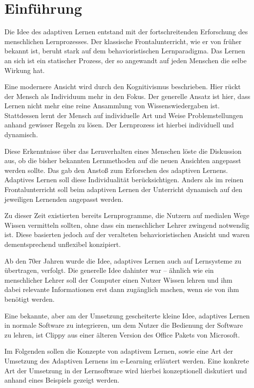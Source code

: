 \chapter{Einführung}

Die Idee des adaptiven Lernen entstand mit der fortschreitenden
Erforschung des menschlichen Lernprozesses.
Der klassische Frontalunterricht, wie er von früher bekannt ist,
beruht stark auf dem behavioristischen Lernparadigma.
Das Lernen an sich ist ein statischer Prozess, der so angewandt
auf jeden Menschen die selbe Wirkung hat.

Eine modernere Ansicht wird durch den Kognitivismus
beschrieben. Hier rückt der Mensch als Individuum mehr in den Fokus.
Der generelle Ansatz ist hier, dass Lernen nicht mehr eine reine
Ansammlung von Wissenswiedergaben ist. Stattdessen lernt der Mensch
auf individuelle Art und Weise Problemstellungen anhand gewisser Regeln zu lösen.
Der Lernprozess ist hierbei individuell und dynamisch.

Diese Erkenntnisse über das Lernverhalten eines Menschen löste die Diskussion aus,
ob die bisher bekannten Lernmethoden auf die neuen Ansichten angepasst werden sollte.
Das gab den Anstoß zum Erforschen des adaptiven Lernens.
Adaptives Lernen soll diese Individualität berücksichtigen.
Anders als im reinen Frontalunterricht soll beim adaptiven Lernen
der Unterricht dynamisch auf den jeweiligen Lernenden angepasst werden.

Zu dieser Zeit existierten bereits Lernprogramme, die Nutzern
auf medialen Wege Wissen vermitteln sollten, ohne dass ein menschlicher Lehrer
zwingend notwendig ist. Diese basierten jedoch auf der veralteten behavioristischen 
Ansicht und waren dementsprechend unflexibel konzipiert. 

Ab den 70er Jahren wurde die Idee, adaptives Lernen auch auf Lernsysteme
zu übertragen, verfolgt. Die generelle Idee dahinter war -- ähnlich wie ein
menschlicher Lehrer soll der Computer einen Nutzer Wissen lehren und
ihm dabei relevante Informationen erst dann zugänglich machen, wenn sie von ihm
benötigt werden. 

Eine bekannte, aber am der Umsetzung gescheiterte kleine Idee, adaptives Lernen
in normale Software zu integrieren, um dem Nutzer die Bedienung der Software zu lehren, 
ist \glqq Clippy\grqq{} aus einer älteren Version des Office Pakets von Microsoft.

Im Folgenden sollen die Konzepte von adaptivem Lernen, sowie eine Art der
Umsetzung des Adaptiven Lernens im e-Learning erläutert werden.
Eine konkrete Art der Umsetzung in der Lernsoftware wird hierbei konzeptionell
diskutiert und anhand eines Beispiels gezeigt werden.


